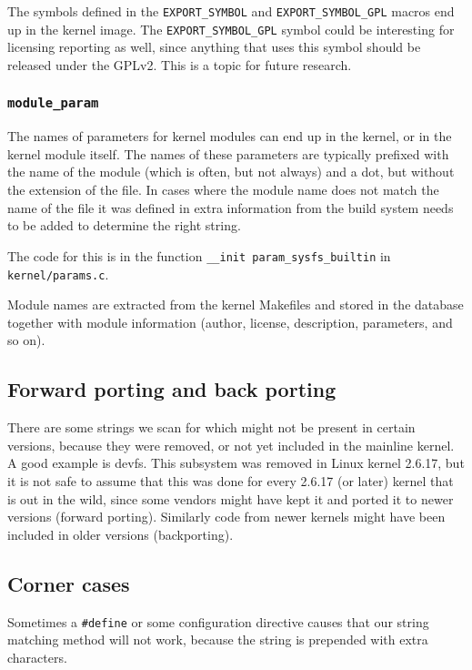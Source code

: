 \documentclass[10pt]{article}
\begin{document}
The symbols defined in the \texttt{EXPORT\_SYMBOL} and
\texttt{EXPORT\_SYMBOL\_GPL} macros end up in the kernel image. The
\texttt{EXPORT\_SYMBOL\_GPL} symbol could be interesting for licensing
reporting as well, since anything that uses this symbol should be released
under the GPLv2. This is a topic for future research.

\subsubsection{\texttt{module\_param}}

The names of parameters for kernel modules can end up in the kernel, or in the
kernel module itself. The names of these parameters are typically prefixed
with the name of the module (which is often, but not always) and a dot, but
without the extension of the file. In cases where the module name does not
match the name of the file it was defined in extra information from the
build system needs to be added to determine the right string.

The code for this is in the function \texttt{\_\_init param\_sysfs\_builtin} in
\texttt{kernel/params.c}.

Module names are extracted from the kernel Makefiles and stored in the database
together with module information (author, license, description, parameters,
and so on).

\subsection{Forward porting and back porting}

There are some strings we scan for which might not be present in certain
versions, because they were removed, or not yet included in the mainline
kernel. A good example is devfs. This subsystem was removed in Linux kernel
2.6.17, but it is not safe to assume that this was done for every 2.6.17 (or
later) kernel that is out in the wild, since some vendors might have kept it
and ported it to newer versions (forward porting). Similarly code from newer
kernels might have been included in older versions
(backporting).

\subsection{Corner cases}

Sometimes a \texttt{\#define} or some configuration directive causes that our 
string matching method will not work, because the string is prepended with
extra characters.
\end{document}
